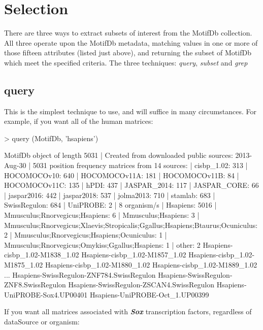 \documentclass{article}
\renewenvironment{Schunk}{\vspace{\topsep}}{\vspace{\topsep}}
\begin{document}
\section{Selection}

There are three ways to extract subsets of interest from the MotifDb collection.  All three operate upon the MotifDb metadata,
matching values in one or more of those fifteen attributes (listed just above), and returning the subset of MotifDb  which
meet the specified criteria.  The three techniques:  \emph{query}, \emph{subset} and \emph{grep}

\subsection{query}
This is the simplest technique to use, and will suffice in many circumstances.  For example, if you want
all of the human matrices:
\begin{Schunk}
\begin{Sinput}
> query (MotifDb, 'hsapiens')
\end{Sinput}
\begin{Soutput}
MotifDb object of length 5031
| Created from downloaded public sources: 2013-Aug-30
| 5031 position frequency matrices from 14 sources:
|         cisbp_1.02:  313
|        HOCOMOCOv10:  640
|       HOCOMOCOv11A:  181
|       HOCOMOCOv11B:   84
|       HOCOMOCOv11C:  135
|               hPDI:  437
|        JASPAR_2014:  117
|        JASPAR_CORE:   66
|         jaspar2016:  442
|         jaspar2018:  537
|          jolma2013:  710
|            stamlab:  683
|       SwissRegulon:  684
|           UniPROBE:    2
| 8 organism/s
|           Hsapiens: 5016
| Mmusculus;Rnorvegicus;Hsapiens:    6
| Mmusculus;Hsapiens:    3
| Mmusculus;Rnorvegicus;Xlaevis;Stropicalis;Ggallus;Hsapiens;Btaurus;Ocuniculus:    2
| Mmusculus;Rnorvegicus;Hsapiens;Ocuniculus:    1
| Mmusculus;Rnorvegicus;Omykiss;Ggallus;Hsapiens:    1
|              other:    2
Hsapiens-cisbp_1.02-M1838_1.02 
Hsapiens-cisbp_1.02-M1857_1.02 
Hsapiens-cisbp_1.02-M1875_1.02 
Hsapiens-cisbp_1.02-M1880_1.02 
Hsapiens-cisbp_1.02-M1889_1.02 
...
Hsapiens-SwissRegulon-ZNF784.SwissRegulon 
Hsapiens-SwissRegulon-ZNF8.SwissRegulon 
Hsapiens-SwissRegulon-ZSCAN4.SwissRegulon 
Hsapiens-UniPROBE-Sox4.UP00401 
Hsapiens-UniPROBE-Oct_1.UP00399 
\end{Soutput}
\end{Schunk}
If you want all matrices associated with \textbf{\emph{Sox}} transcription factors, regardless of dataSource or organism:
\end{document}
